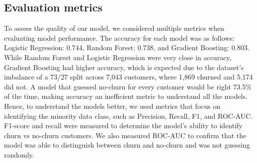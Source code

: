 \documentclass{article}
\begin{document}
\subsection{Evaluation metrics}
To assess the quality of our model, we considered multiple metrics when evaluating model performance. The accuracy for each model was as follows: Logistic Regression: 0.744, Random Forest: 0.738, and Gradient Boosting: 0.803. While Random Forest and Logistic Regression were very close in accuracy, Gradient Boosting had higher accuracy, which is expected due to the dataset's imbalance of a 73/27 split across 7,043 customers, where 1,869 churned and 5,174 did not. A model that guessed no-churn for every customer would be right 73.5\% of the time, making accuracy an inefficient metric to understand all the models. Hence, to understand the models better, we used metrics that focus on identifying the minority data class, such as Precision, Recall, F1, and ROC-AUC. F1-score and recall were measured to determine the model's ability to identify churn vs no-churn customers. We also measured ROC-AUC to confirm that the model was able to distinguish between churn and no-churn and was not guessing randomly.
\end{document}
